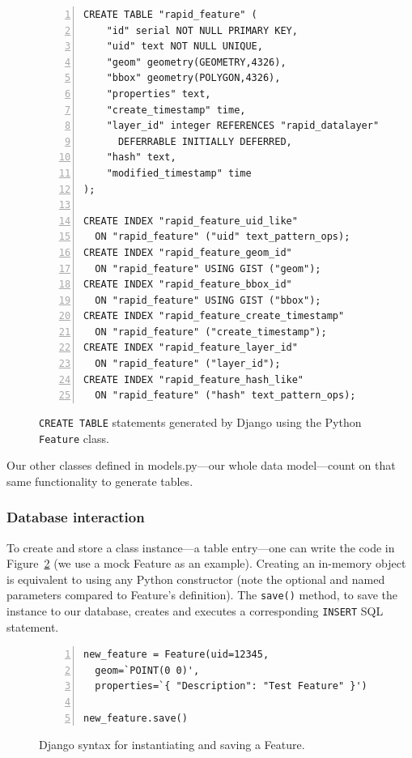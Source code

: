 
\begin{figure}[ht]
\begin{Verbatim}[samepage=true,baselinestretch=1,numbers=left,xleftmargin=12mm]
CREATE TABLE "rapid_feature" (
    "id" serial NOT NULL PRIMARY KEY,
    "uid" text NOT NULL UNIQUE,
    "geom" geometry(GEOMETRY,4326),
    "bbox" geometry(POLYGON,4326),
    "properties" text,
    "create_timestamp" time,
    "layer_id" integer REFERENCES "rapid_datalayer" ("id")
      DEFERRABLE INITIALLY DEFERRED,
    "hash" text,
    "modified_timestamp" time
);

CREATE INDEX "rapid_feature_uid_like"
  ON "rapid_feature" ("uid" text_pattern_ops);
CREATE INDEX "rapid_feature_geom_id"
  ON "rapid_feature" USING GIST ("geom");
CREATE INDEX "rapid_feature_bbox_id"
  ON "rapid_feature" USING GIST ("bbox");
CREATE INDEX "rapid_feature_create_timestamp"
  ON "rapid_feature" ("create_timestamp");
CREATE INDEX "rapid_feature_layer_id"
  ON "rapid_feature" ("layer_id");
CREATE INDEX "rapid_feature_hash_like"
  ON "rapid_feature" ("hash" text_pattern_ops);
\end{Verbatim}
\caption{\texttt{CREATE TABLE} statements generated by Django using the Python \texttt{Feature} class.}
\label{fig:sql}
\end{figure}

Our other classes defined in models.py---our whole data model---count on that same functionality to generate tables.

\subsubsection{Database interaction}
To create and store a class instance---a table entry---one can write the code in Figure~\ref{fig:save} (we use a mock Feature as an example). Creating an in-memory object is equivalent to using any Python constructor (note the optional and named parameters compared to Feature's definition). The \texttt{save()} method, to save the instance to our database, creates and executes a corresponding \texttt{INSERT} SQL statement.

\begin{figure}[ht]
\begin{Verbatim}[samepage=true,baselinestretch=1,numbers=left,xleftmargin=12mm]
new_feature = Feature(uid=12345,
  geom=`POINT(0 0)',
  properties=`{ "Description": "Test Feature" }')
  
new_feature.save()
\end{Verbatim}
\caption{Django syntax for instantiating and saving a Feature.}
\label{fig:save}
\end{figure}

